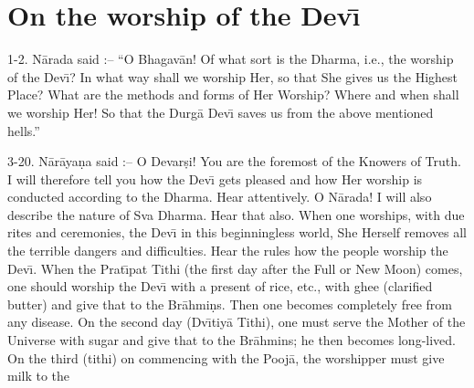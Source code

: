 \chapter{On the worship of the Dev\={\i}}

1-2. N\=arada said :-- ``O Bhagav\=an! Of what sort is the Dharma, i.e., the worship of the Dev\={\i}? In what way shall we worship Her, so that She gives us the Highest Place? What are the methods and forms of Her Worship? Where and when shall we worship Her! So that the Durg\=a Dev\={\i} saves us from the above mentioned hells.''

3-20. N\=ar\=aya\d{n}a said :-- O Devar\d{s}i! You are the foremost of the Knowers of Truth. I will therefore tell you how the Dev\={\i} gets pleased and how Her worship is conducted according to the Dharma. Hear attentively. O N\=arada! I will also describe the nature of Sva Dharma. Hear that also. When one worships, with due rites and ceremonies, the Dev\={\i} in this beginningless world, She Herself removes all the terrible dangers and difficulties. Hear the rules how the people worship the Dev\={\i}. When the Prat\={\i}pat Tithi (the first day after the Full or New Moon) comes, one should worship the Dev\={\i} with a present of rice, etc., with ghee (clarified butter) and give that to the Br\=ahmi\d{n}s. Then one becomes completely free from any disease. On the second day (Dv\={\i}tiy\=a Tithi), one must serve the Mother of the Universe with sugar and give that to the Br\=ahmins; he then becomes long-lived. On the third (tithi) on commencing with the Pooj\=a, the worshipper must give milk to the

